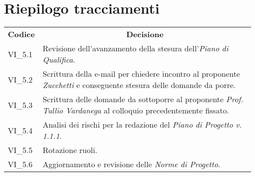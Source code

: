 
\section{Riepilogo tracciamenti}
\begin{longtable} {
		>{\centering}p{17mm} 
		>{}p{120mm}}
	\rowcolor{gray!50}
	\textbf{Codice} & \multicolumn{1}{c}{\textbf{Decisione}} \\%
	VI\_5.1 & Revisione dell'avanzamento della stesura dell'\textit{Piano di Qualifica}. \TBstrut \\ [2mm]
	VI\_5.2 & Scrittura della e-mail per chiedere incontro al proponente \textit{Zucchetti} e conseguente stesura delle domande da porre. \TBstrut \\ [2mm]
	VI\_5.3 & Scrittura delle domande da sottoporre al proponente \textit{Prof. Tullio Vardanega} al colloquio precedentemente fissato. \TBstrut \\ [2mm]
	VI\_5.4 & Analisi dei rischi per la redazione del \textit{Piano di Progetto v. 1.1.1}. \TBstrut \\ [2mm]
	VI\_5.5 & Rotazione ruoli. \TBstrut \\ [2mm]
	VI\_5.6 & Aggiornamento e revisione delle \textit{Norme di Progetto}. \TBstrut \\ [2mm]
\end{longtable}